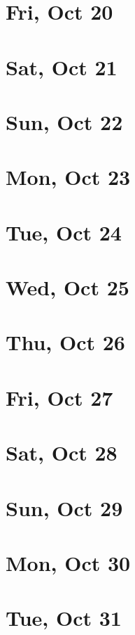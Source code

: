 	\section{Fri, Oct 20}
		
		
	\section{Sat, Oct 21}
		
		
	\section{Sun, Oct 22}
		
		
	\section{Mon, Oct 23}
		
		
	\section{Tue, Oct 24}
		
		
	\section{Wed, Oct 25}
		
		
	\section{Thu, Oct 26}
		
		
	\section{Fri, Oct 27}
		
		
	\section{Sat, Oct 28}
		
		
	\section{Sun, Oct 29}
		
		
	\section{Mon, Oct 30}
		
		
	\section{Tue, Oct 31}
		
		
